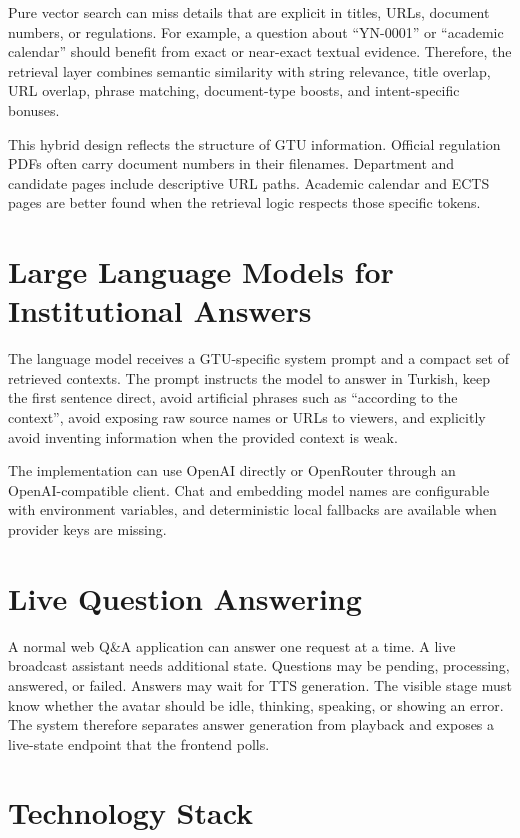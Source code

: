 Pure vector search can miss details that are explicit in titles, URLs, document numbers, or regulations. For example, a question about ``YN-0001'' or ``academic calendar'' should benefit from exact or near-exact textual evidence. Therefore, the retrieval layer combines semantic similarity with string relevance, title overlap, URL overlap, phrase matching, document-type boosts, and intent-specific bonuses.

This hybrid design reflects the structure of GTU information. Official regulation PDFs often carry document numbers in their filenames. Department and candidate pages include descriptive URL paths. Academic calendar and ECTS pages are better found when the retrieval logic respects those specific tokens.

\section{Large Language Models for Institutional Answers}

The language model receives a GTU-specific system prompt and a compact set of retrieved contexts. The prompt instructs the model to answer in Turkish, keep the first sentence direct, avoid artificial phrases such as ``according to the context'', avoid exposing raw source names or URLs to viewers, and explicitly avoid inventing information when the provided context is weak.

The implementation can use OpenAI directly or OpenRouter through an OpenAI-compatible client. Chat and embedding model names are configurable with environment variables, and deterministic local fallbacks are available when provider keys are missing.

\section{Live Question Answering}

A normal web Q\&A application can answer one request at a time. A live broadcast assistant needs additional state. Questions may be pending, processing, answered, or failed. Answers may wait for TTS generation. The visible stage must know whether the avatar should be idle, thinking, speaking, or showing an error. The system therefore separates answer generation from playback and exposes a live-state endpoint that the frontend polls.

\section{Technology Stack}

